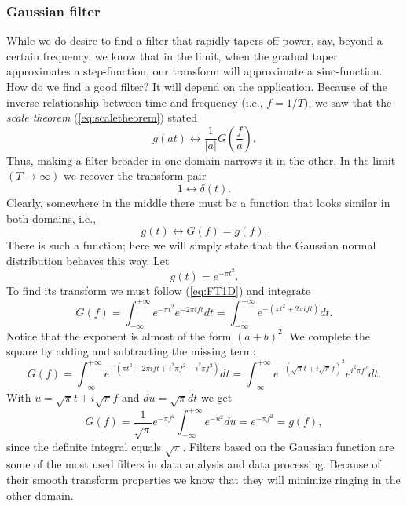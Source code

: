 \subsubsection{Gaussian filter}
\label{sec:gaussianfilter}
While we do desire to find a filter that rapidly tapers off power, say, beyond a certain
frequency, we know that in the limit, when the gradual taper approximates a step-function,
our transform will approximate a $\operatorname{sinc}$-function. How do we find a good filter?
It will depend on the application. Because of the inverse relationship between time and frequency (i.e., $f =
1/T)$, we saw that the \emph{scale theorem} (\ref{eq:scaletheorem}) stated
$$
g(at)\leftrightarrow \frac{1}{|a|} G \left (\frac{f}{a} \right ).
$$
Thus, making a filter broader in one domain narrows it in the other. In the limit $(T \rightarrow \infty )$
we recover the transform pair
$$
1 \leftrightarrow \delta(t).
$$
Clearly, somewhere in the middle there must be a function that looks similar in both
domains, i.e.,
$$
g(t) \leftrightarrow G(f) = g(f).
$$
There is such a function; here we will simply state that the Gaussian normal distribution
behaves this way. Let
$$
g(t)=e^{-\pi t^2}.
$$
To find its transform we must follow (\ref{eq:FT1D}) and integrate
$$
G(f) = \int^{+ \infty}_{-\infty}
e ^{- \pi t^2} e ^{-2 \pi ift} dt =
\int ^{+ \infty}_{-\infty}
e^{-(\pi t ^2 + 2 \pi ift)}
dt.
$$
Notice that the exponent is almost of the form $(a+b)^2$. We complete the square by adding and
subtracting the missing term:
$$
G(f) = \int^{+ \infty}_{-\infty} e ^{-( \pi t ^2 + 2 \pi ift + i^2 \pi f ^2 -i ^2 \pi f^2)}
dt = \displaystyle \int ^{+ \infty}_{-\infty} e^{-( \sqrt{\pi} t + i \sqrt{\pi} f ) ^2 } e^{i^2 \pi f^2} dt.
$$
With $u = \sqrt{ \pi} t + i \sqrt{\pi} f $ and $du = \sqrt{\pi} dt$ we get
\begin{equation}
G(f) = \frac{1}{\sqrt{\pi}} e ^{- \pi f^2} \int ^{+ \infty}_{-\infty} e^{-u^2} du = e ^{- \pi f^2} = g (f),
\label{eq:gaussfilt1d}
\end{equation}
since the definite integral equals $\sqrt{\pi}$.  Filters based on the Gaussian function are some of the most used filters in data analysis and
data processing. Because of their smooth transform properties we know that they will
minimize ringing in the other domain.

